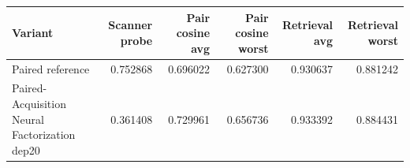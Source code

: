 \begin{tabular}{lrrrrr}
\toprule
Variant & Scanner probe & Pair cosine avg & Pair cosine worst & Retrieval avg & Retrieval worst \\
\midrule
Paired reference & 0.752868 & 0.696022 & 0.627300 & 0.930637 & 0.881242 \\
Paired-Acquisition Neural Factorization dep20 & 0.361408 & 0.729961 & 0.656736 & 0.933392 & 0.884431 \\
\bottomrule
\end{tabular}
